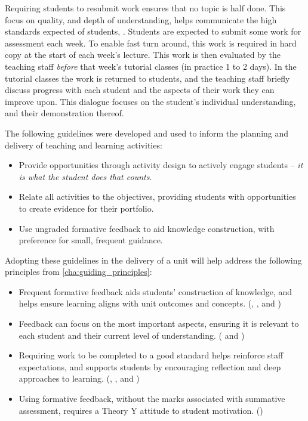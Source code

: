 Requiring students to resubmit work ensures that no topic is half done. This focus on quality, and depth of understanding, helps communicate the high standards expected of students, . Students are expected to submit some work for assessment each week. To enable fast turn around, this work is required in hard copy at the start of each week's lecture. This work is then evaluated by the teaching staff \emph{before} that week's tutorial classes (in practice 1 to 2 days). In the tutorial classes the work is returned to students, and the teaching staff briefly discuss progress with each student and the aspects of their work they can improve upon. This dialogue focuses on the student's individual understanding, and their demonstration thereof.

The following guidelines were developed and used to inform the planning and delivery of teaching and learning activities:

%
% 

\begin{itemize}[noitemsep,nolistsep]
  \item Provide opportunities through activity design to actively engage students -- \emph{it is what the student does that counts}.  
  \item Relate all activities to the objectives, providing students with opportunities to create evidence for their portfolio.
  \item Use ungraded formative feedback to aid knowledge construction, with preference for small, frequent guidance.
\end{itemize}

Adopting these guidelines in the delivery of a unit will help address the following principles from \cref{cha:guiding_principles}:

\begin{itemize}[noitemsep,nolistsep]
	\item Frequent formative feedback aids students' construction of knowledge, and helps ensure learning aligns with unit outcomes and concepts. (, ,  and )
	\item Feedback can focus on the most important aspects, ensuring it is relevant to each student and their current level of understanding. ( and )
	\item Requiring work to be completed to a good standard helps reinforce staff expectations, and supports students by encouraging reflection and deep approaches to learning. (, , and )
	\item Using formative feedback, without the marks associated with summative assessment, requires a Theory Y attitude to student motivation. ()
\end{itemize}

